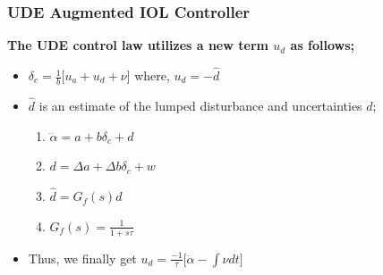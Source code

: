 \documentclass[table,10pt,red]{beamer}	%
\begin{document}
\begin{frame}
\frametitle{UDE Augmented IOL Controller}
\textbf{The UDE control law utilizes a new term $u_d$ as follows;}
\begin{itemize}  %
		\item $\delta_c = \frac{1}{b}\Big[u_a+u_d+\nu\Big]$ where, $u_d = -\hat{d}$
		\item $\hat{d}$ is an estimate of the lumped disturbance and uncertainties $d$;

		\begin{enumerate}
			\item $\dddot{\alpha} = a + b\delta_c + d$
			\item $d = \Delta a + \Delta b \delta_c + w$
			\item $\hat{d}=G_f(s)d$
			\item $G_f(s)=\frac{1}{1+s\tau}$ \\
		\end{enumerate}
\end{itemize}

\begin{itemize}
	\item Thus, we finally get
	$u_d=\frac{-1}{\tau}\Big[\ddot{\alpha}-\int{\nu dt}\Big] \label{ude}$
	
\end{itemize}

\end{frame}
\end{document}
